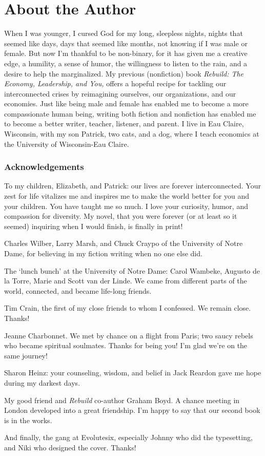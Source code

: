 \chapter*{About the Author}

When I was younger, I cursed God for my long, sleepless nights, nights
that seemed like days, days that seemed like months, not knowing if I
was male or female. But now I'm thankful to be non-binary, for it has
given me a creative edge, a humility, a sense of humor, the willingness
to listen to the rain, and a desire to help the marginalized. My
previous (nonfiction) book \emph{Rebuild: The Economy, Leadership, and
You,} offers a hopeful recipe for tackling our interconnected crises by
reimagining ourselves, our organizations, and our economies. Just like
being male and female has enabled me to become a more compassionate
human being, writing both fiction and nonfiction has enabled me to
become a better writer, teacher, listener, and parent. I live in Eau
Claire, Wisconsin, with my son Patrick, two cats, and a dog, where I
teach economics at the University of Wisconsin-Eau Claire.

\subsection*{Acknowledgements}

To my children, Elizabeth, and Patrick: our lives are forever
interconnected. Your zest for life vitalizes me and inspires me to make
the world better for you and your children. You have taught me so much.
I love your curiosity, humor, and compassion for diversity. My novel,
that you were forever (or at least so it seemed) inquiring when I would
finish, is finally in print!

Charles Wilber, Larry Marsh, and Chuck Craypo of the University of Notre
Dame, for believing in my fiction writing when no one else did.

The `lunch bunch' at the University of Notre Dame: Carol Wambeke,
Augusto de la Torre, Marie and Scott van der Linde. We came from
different parts of the world, connected, and became life-long friends.

Tim Crain, the first of my close friends to whom I confessed. We remain
close. Thanks!

Jeanne Charbonnet. We met by chance on a flight from Paris; two saucy
rebels who became spiritual soulmates. Thanks for being you! I'm glad
we're on the same journey!

Sharon Heinz: your counseling, wisdom, and belief in Jack Reardon gave
me hope during my darkest days.

My good friend and \emph{Rebuild} co-author Graham Boyd. A chance
meeting in London developed into a great friendship. I'm happy to say
that our second book is in the works.

And finally, the gang at Evolutesix, especially Johnny who did the
typesetting, and Niki who designed the cover. Thanks!
